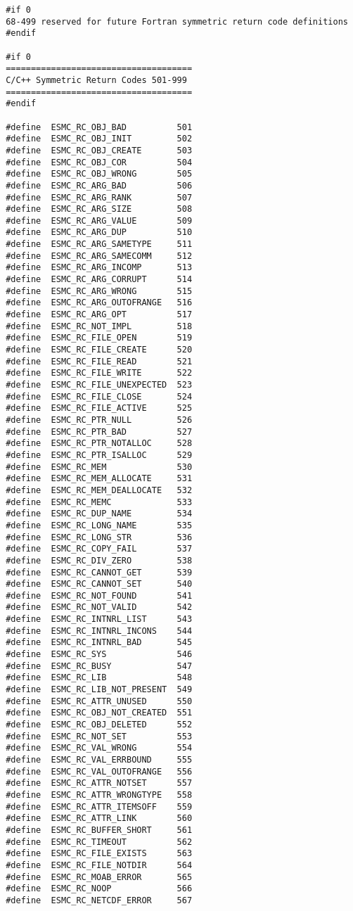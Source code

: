 \begin{verbatim}
 #if 0
 68-499 reserved for future Fortran symmetric return code definitions
 #endif
 
 #if 0
 =====================================
 C/C++ Symmetric Return Codes 501-999
 =====================================
 #endif
 
 #define  ESMC_RC_OBJ_BAD          501
 #define  ESMC_RC_OBJ_INIT         502
 #define  ESMC_RC_OBJ_CREATE       503
 #define  ESMC_RC_OBJ_COR          504
 #define  ESMC_RC_OBJ_WRONG        505
 #define  ESMC_RC_ARG_BAD          506
 #define  ESMC_RC_ARG_RANK         507
 #define  ESMC_RC_ARG_SIZE         508
 #define  ESMC_RC_ARG_VALUE        509
 #define  ESMC_RC_ARG_DUP          510
 #define  ESMC_RC_ARG_SAMETYPE     511
 #define  ESMC_RC_ARG_SAMECOMM     512
 #define  ESMC_RC_ARG_INCOMP       513
 #define  ESMC_RC_ARG_CORRUPT      514
 #define  ESMC_RC_ARG_WRONG        515
 #define  ESMC_RC_ARG_OUTOFRANGE   516
 #define  ESMC_RC_ARG_OPT          517
 #define  ESMC_RC_NOT_IMPL         518
 #define  ESMC_RC_FILE_OPEN        519
 #define  ESMC_RC_FILE_CREATE      520
 #define  ESMC_RC_FILE_READ        521
 #define  ESMC_RC_FILE_WRITE       522
 #define  ESMC_RC_FILE_UNEXPECTED  523
 #define  ESMC_RC_FILE_CLOSE       524
 #define  ESMC_RC_FILE_ACTIVE      525
 #define  ESMC_RC_PTR_NULL         526
 #define  ESMC_RC_PTR_BAD          527
 #define  ESMC_RC_PTR_NOTALLOC     528
 #define  ESMC_RC_PTR_ISALLOC      529
 #define  ESMC_RC_MEM              530
 #define  ESMC_RC_MEM_ALLOCATE     531
 #define  ESMC_RC_MEM_DEALLOCATE   532
 #define  ESMC_RC_MEMC             533
 #define  ESMC_RC_DUP_NAME         534
 #define  ESMC_RC_LONG_NAME        535
 #define  ESMC_RC_LONG_STR         536
 #define  ESMC_RC_COPY_FAIL        537
 #define  ESMC_RC_DIV_ZERO         538
 #define  ESMC_RC_CANNOT_GET       539
 #define  ESMC_RC_CANNOT_SET       540
 #define  ESMC_RC_NOT_FOUND        541
 #define  ESMC_RC_NOT_VALID        542
 #define  ESMC_RC_INTNRL_LIST      543
 #define  ESMC_RC_INTNRL_INCONS    544
 #define  ESMC_RC_INTNRL_BAD       545
 #define  ESMC_RC_SYS              546
 #define  ESMC_RC_BUSY             547
 #define  ESMC_RC_LIB              548
 #define  ESMC_RC_LIB_NOT_PRESENT  549
 #define  ESMC_RC_ATTR_UNUSED      550
 #define  ESMC_RC_OBJ_NOT_CREATED  551
 #define  ESMC_RC_OBJ_DELETED      552
 #define  ESMC_RC_NOT_SET          553
 #define  ESMC_RC_VAL_WRONG        554
 #define  ESMC_RC_VAL_ERRBOUND     555
 #define  ESMC_RC_VAL_OUTOFRANGE   556
 #define  ESMC_RC_ATTR_NOTSET      557
 #define  ESMC_RC_ATTR_WRONGTYPE   558
 #define  ESMC_RC_ATTR_ITEMSOFF    559
 #define  ESMC_RC_ATTR_LINK        560
 #define  ESMC_RC_BUFFER_SHORT     561
 #define  ESMC_RC_TIMEOUT          562
 #define  ESMC_RC_FILE_EXISTS      563
 #define  ESMC_RC_FILE_NOTDIR      564
 #define  ESMC_RC_MOAB_ERROR       565
 #define  ESMC_RC_NOOP             566
 #define  ESMC_RC_NETCDF_ERROR     567
 

\end{verbatim}
